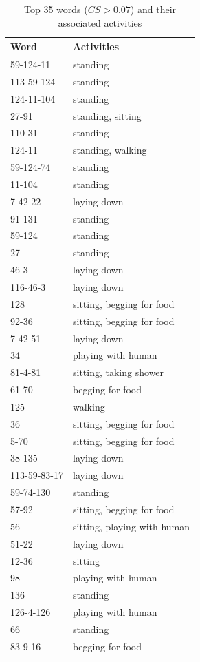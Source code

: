 \begin{table}[th]
\centering
\small
\begin{tabular}{ll}
\hline
\textbf{Word} & \textbf{Activities} \\
\hline
59-124-11 & standing \\
113-59-124 & standing \\
124-11-104 & standing \\
27-91 & standing, sitting \\
110-31 & standing \\
124-11 & standing, walking \\
59-124-74 & standing \\
11-104 & standing \\
7-42-22 & laying down \\
91-131 & standing \\
59-124 & standing \\
27 & standing \\
46-3 & laying down \\
116-46-3 & laying down \\
128 & sitting, begging for food \\
92-36 & sitting, begging for food \\
7-42-51 & laying down \\
34 & playing with human \\
81-4-81 & sitting, taking shower \\
61-70 & begging for food \\
125 & walking \\
36 & sitting, begging for food \\
5-70 & sitting, begging for food \\
38-135 & laying down \\
113-59-83-17 & laying down \\
59-74-130 & standing \\
57-92 & sitting, begging for food \\
56 & sitting, playing with human \\
51-22 & laying down \\
12-36 & sitting \\
98 & playing with human \\
136 & standing \\
126-4-126 & playing with human \\
66 & standing \\
83-9-16 & begging for food \\\hline
\end{tabular}
\caption{Top 35 words ($CS > 0.07$) and their associated activities}
\label{tab:wordact}
\end{table}


